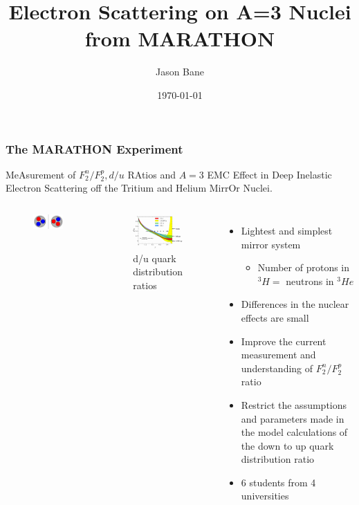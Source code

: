\documentclass{beamer}
\title[MARATHON A=3]{Electron Scattering on A=3 Nuclei from MARATHON } %
\author{Jason Bane} %
\institute[UTK] %
{
	University of Tennessee \\ %
	\medskip
	\textit{jbane1@vols.utk.edu} %
}
\date{\today} %
\begin{document}
\begin{frame}
	\titlepage %
\end{frame}


\begin{frame}
\frametitle{The MARATHON Experiment}
	MeAsurement of $F^n_2/F^p_2, d/u$ RAtios and $A=3$ EMC Effect in Deep Inelastic Electron Scattering off the Tritium and Helium MirrOr Nuclei.
	\vspace{-10pt}
	\begin{columns}[t]
		\begin{figure}
			\includegraphics[width =5cm]{../images/mirror}
		\end{figure}
		\vspace{-25pt}
		\begin{figure}
			\includegraphics[width=5cm]{../images/d_u}
			\caption{d/u quark distribution ratios}
		\end{figure}
		\begin{itemize}
			\item Lightest and simplest mirror system
		\begin{itemize}
			\item  Number of protons in $^3H =$ neutrons in $^3He$
		\end{itemize}
			\item Differences in the nuclear effects are small
			\item Improve the current measurement and understanding of $F^n_2/F^p_2$ ratio
			\item Restrict the assumptions and parameters made in the model calculations of the down to up quark distribution ratio
			\item 6 students from 4 universities
		\end{itemize}
	\end{columns}
\end{frame}
\end{document}

